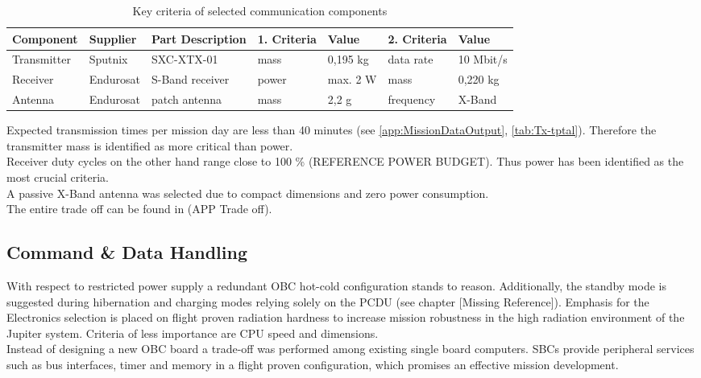 \begin{table}[h]
\centering
\caption{Key criteria of selected communication components}
\begin{tabular}{lll|ll|ll}
Component   & Supplier  & Part Description     & 1. Criteria   & Value    & 2. Criteria & Value          \\ \hline\hline
Transmitter & Sputnix   & SXC-XTX-01           & mass          & 0,195 kg & data rate   & 10 Mbit/s \\
Receiver    & Endurosat & S-Band receiver      & power         & max. 2 W & mass        & 0,220 kg       \\
Antenna     & Endurosat & patch antenna & mass          & 2,2 g    & frequency   & X-Band         \\ \hline
\end{tabular}
\label{tab:ComCompComp}
\end{table}

Expected transmission times per mission day are less than 40 minutes (see \autoref{app:MissionDataOutput}, \autoref{tab:Tx-tptal}). Therefore the transmitter mass is identified as more critical than power. \\
Receiver duty cycles on the other hand range close to 100 \% (REFERENCE POWER BUDGET). Thus power has been identified as the most crucial criteria. \\
A passive X-Band antenna was selected due to compact dimensions and zero power consumption.  \\
The entire trade off can be found in (APP Trade off).

 \subsection{Command \& Data Handling}
 
 With respect to restricted power supply a redundant OBC hot-cold configuration stands to reason. Additionally, the standby mode is suggested during hibernation and charging modes relying solely on the PCDU (see chapter [Missing Reference]). 
Emphasis for the Electronics selection is placed on flight proven radiation hardness to increase mission robustness in the high radiation environment of the Jupiter system. 
Criteria of less importance are CPU speed and dimensions. \\

Instead of designing a new OBC board a trade-off was performed among existing single board computers. SBCs provide peripheral services such as bus interfaces, timer and memory in a flight proven configuration, which promises an effective mission development. \\

